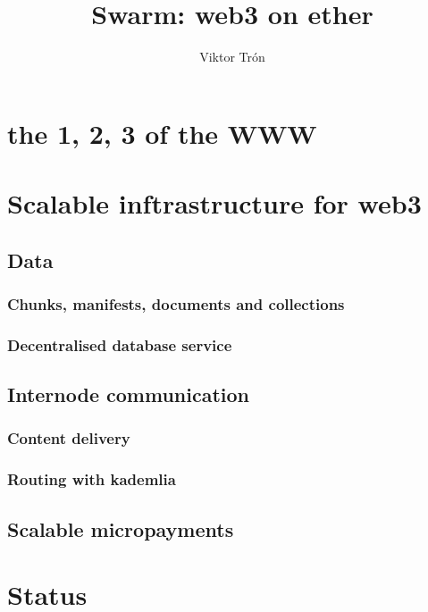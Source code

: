 \documentclass{beamer}
\title{Swarm: web3 on ether}
\author{Viktor Trón}
\begin{document}
\begin{frame}
 \titlepage
\end{frame}

\section{the 1, 2, 3 of the WWW}


\section{Scalable inftrastructure for web3}
\subsection{Data}
\subsubsection{Chunks, manifests, documents and collections}

\subsubsection{Decentralised database service}


\subsection{Internode communication}
\subsubsection{Content delivery}

\subsubsection{Routing with kademlia}


\subsection{Scalable micropayments}
% 


\section{Status}
 
\end{document}
